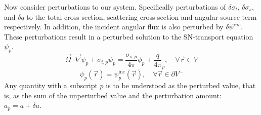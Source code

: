 \documentclass[12pt]{report}
\newcommand{\vr}{\vec{r}}
\newcommand{\vO}{\vec{\Omega}}
\newcommand{\grad}{\vec{\nabla}}
\newcommand{\sigt}{\sigma_t}
\newcommand{\sigs}{\sigma_s}
\newcommand{\angSource}{\frac{q}{4 \pi}}
\begin{document}
Now consider perturbations to our system. Specifically perturbations of $\delta \sigt$, $\delta \sigs$, and $\delta q$ to the total cross section, scattering cross section and angular source term respectively. In addition, the incident angular flux is also perturbed by $\delta \psi^{inc}$. These perturbations result in a perturbed solution to the SN-transport equation $\psi_p$. 
\begin{equation}
\label{snFwdPert}
\vO \cdot \grad \psi_p + \sigma_{t,p} \psi_p = \frac{\sigma_{s,p}}{4 \pi} \phi_p + \angSource_p,  \quad \forall \vr \in V
\end{equation}
\begin{equation}
\psi_p(\vr) = \psi_p^{\text{inc}}(\vr), \quad \forall \vr \in \partial V^{-}
\end{equation}
Any quantity with a subscript $p$ is to be understood as the perturbed value, that is, as 
the sum of the unperturbed value and the perturbation amount: $a_p = a + \delta a$.
\end{document}
